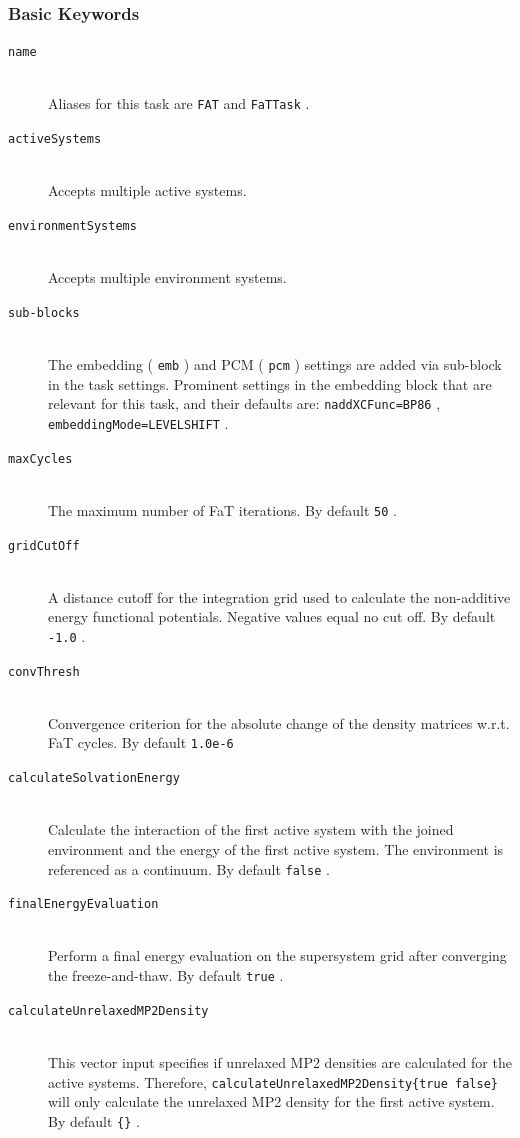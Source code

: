 \documentclass[bibliography=totocnumbered,a4paper,10pt,oneside]{scrbook}
\newcommand{\ttt}[1]{%
  \begingroup\setlength{\fboxsep}{1pt}%
  \colorbox{serenity-green!30}{\texttt{\hspace*{2pt}\vphantom{(g}#1\hspace*{2pt}}}%
  \endgroup
}
\begin{document}
\subsubsection{Basic Keywords}
\begin{description}
	\item [\texttt{name}]\hfill \\
	Aliases for this task are \ttt{FAT} and \ttt{FaTTask}.
	\item [\texttt{activeSystems}]\hfill \\
	Accepts multiple active systems.
	\item [\texttt{environmentSystems}]\hfill \\
	Accepts multiple environment systems.
	\item [\texttt{sub-blocks}]\hfill \\
	The embedding (\ttt{emb}) and PCM (\ttt{pcm}) settings are added via sub-block in the task settings.
	Prominent settings in the embedding block that are relevant for this task, and their defaults are:
	\ttt{naddXCFunc=BP86}, \ttt{embeddingMode=LEVELSHIFT}.
	\item [\texttt{maxCycles}]\hfill \\
	The maximum number of FaT iterations. By default \ttt{50}.
	\item [\texttt{gridCutOff}]\hfill \\
	A distance cutoff for the integration grid used to calculate the non-additive  energy functional potentials. Negative values equal no cut off. By default \ttt{-1.0}.
	\item [\texttt{convThresh}]\hfill \\
	Convergence criterion for the absolute change of the density matrices w.r.t. FaT cycles. By default \ttt{1.0e-6}
	\item [\texttt{calculateSolvationEnergy}]\hfill \\
	Calculate the interaction of the first active system with the joined environment and the energy of the first active system. The environment is referenced as a continuum. By default \ttt{false}.
	\item [\texttt{finalEnergyEvaluation}]\hfill \\
	Perform a final energy evaluation on the supersystem grid after converging the freeze-and-thaw. By default \ttt{true}.
  \item[\texttt{calculateUnrelaxedMP2Density}]\hfill \\
  This vector input specifies if unrelaxed MP2 densities are calculated for the active systems. Therefore, \ttt{calculateUnrelaxedMP2Density\{true false\}} will only calculate the unrelaxed MP2 density for the first active system. By default \ttt{\{\}}.
\end{description}
\end{document}
